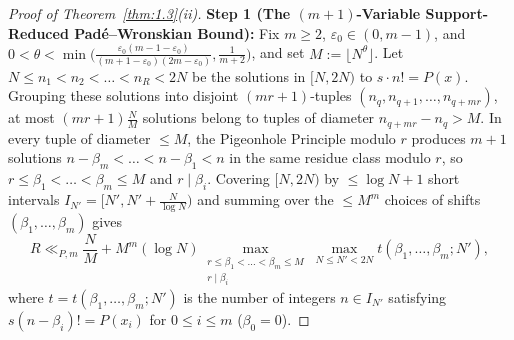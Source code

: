 \documentclass[11pt,reqno]{amsart}
\theoremstyle{remark}
\numberwithin{equation}{section}
\begin{document}
\begin{proof}[Proof of Theorem~\ref{thm:1.3}(ii)]
\textbf{Step 1 (The $(m + 1)$-Variable Support-Reduced Pad\'e--Wronskian Bound):} Fix $m \ge 2$, $\varepsilon_0 \in (0, m - 1)$, and $0 < \theta < \min\bigl(\frac{\varepsilon_0(m - 1 - \varepsilon_0)}{(m + 1 - \varepsilon_0)(2m - \varepsilon_0)}, \frac{1}{m+2}\bigr)$, and set $M := \lfloor N^\theta \rfloor$. Let $N \le n_1 < n_2 < \dots < n_R < 2N$ be the solutions in $[N, 2N)$ to $s \cdot n! = P(x)$. Grouping these solutions into disjoint $(mr + 1)$-tuples $(n_q, n_{q+1}, \dots, n_{q+mr})$, at most $(mr + 1)\frac{N}{M}$ solutions belong to tuples of diameter $n_{q+mr} - n_q > M$. In every tuple of diameter $\le M$, the Pigeonhole Principle modulo $r$ produces $m + 1$ solutions $n - \beta_m < \dots < n - \beta_1 < n$ in the same residue class modulo $r$, so $r \le \beta_1 < \dots < \beta_m \le M$ and $r \mid \beta_i$. Covering $[N, 2N)$ by $\le \log N + 1$ short intervals $I_{N'} = [N', N' + \frac{N}{\log N})$ and summing over the $\le M^m$ choices of shifts $(\beta_1, \dots, \beta_m)$ gives
\begin{equation}\label{eq:7.17}
R \ll_{P,m} \frac{N}{M} + M^m(\log N) \max_{\substack{r \le \beta_1 < \dots < \beta_m \le M \\ r \mid \beta_i}} \max_{N \le N' < 2N} t(\beta_1, \dots, \beta_m; N'),
\end{equation}
where $t = t(\beta_1, \dots, \beta_m; N')$ is the number of integers $n \in I_{N'}$ satisfying $s(n - \beta_i)! = P(x_i)$ for $0 \le i \le m$ ($\beta_0 = 0$).


\end{proof}
\end{document}
